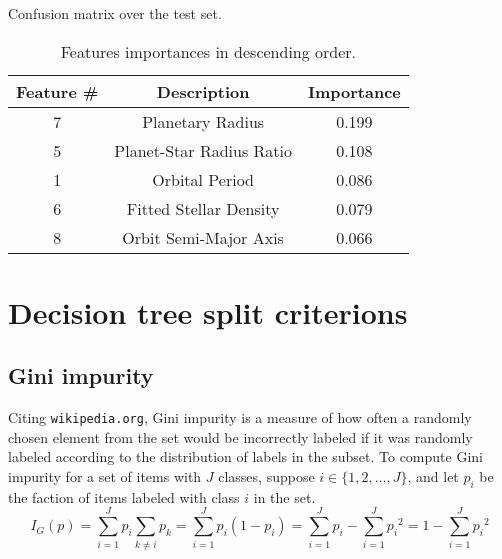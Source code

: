 \documentclass[11pt, a4paper]{article}
\begin{document}
  \begin{table}
    \centering
    \caption{Confusion matrix over the test set.}
    \label{table:confusion}
  \end{table}

  \begin{table}
    \centering
    \begin{tabular}{|c c c|}
    \hline
    Feature \# & Description & Importance \\
    \hline\hline
    7 & Planetary Radius & 0.199 \\
    5 & Planet-Star Radius Ratio & 0.108 \\
    1 & Orbital Period & 0.086 \\
    6 & Fitted Stellar Density & 0.079 \\
    8 & Orbit Semi-Major Axis & 0.066 \\
    \hline
    \end{tabular}
    \caption{Features importances in descending order.}
    \label{table:importances}
  \end{table}

\appendix
\section{Decision tree split criterions}
  \label{appendix:splitcriterions}
  \subsection{Gini impurity}
    Citing \texttt{wikipedia.org}, Gini impurity is a measure of how often a randomly chosen element from the set would be incorrectly labeled if it was randomly labeled according to the distribution of labels in the subset. To compute Gini impurity for a set of items with $J$ classes, suppose $i\in\{1,2,...,J\}$, and let $p_{i}$ be the faction of items labeled with class $i$ in the set.
    \[{I} _{G}(p)=\sum _{i=1}^{J}p_{i}\sum _{k\neq i}p_{k}=\sum _{i=1}^{J}p_{i}(1-p_{i})=\sum _{i=1}^{J}p_{i}-\sum _{i=1}^{J}{p_{i}}^{2}=1-\sum _{i=1}^{J}{p_{i}}^{2}\]
\end{document}
